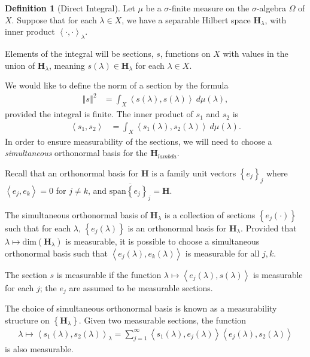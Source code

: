 \documentclass[12pt]{extarticle}
\newcommand{\set}[1]{\left\{#1\right\}}
\newcommand{\iprod}[2]{\left\langle #1,#2\right\rangle}
\newcommand{\norm}[1]{\left\Vert #1\right\Vert}
\theoremstyle{plain}
\theoremstyle{definition}
\newtheorem*{definition}{Definition}
\theoremstyle{remark}
\renewcommand{\newline}{\hfill\break}
\begin{document}
  \begin{definition}[Direct Integral]
    Let $\mu$ be a $\sigma$-finite measure on the $\sigma$-algebra $\Omega$ of $X$. Suppose that for each $\lambda \in X$, we have a separable Hilbert space $\mathbf{H}_{\lambda}$, with inner product $\iprod{\cdot}{\cdot}_{\lambda}$.\newline

    Elements of the integral will be sections, $s$, functions on $X$ with values in the union of $\mathbf{H}_{\lambda}$, meaning $s(\lambda)\in \mathbf{H}_{\lambda}$ for each $\lambda \in X$.\newline

    We would like to define the norm of a section by the formula
    \begin{align*}
      \norm{s}^{2} &= \int_{X}^{} \iprod{s(\lambda)}{s(\lambda)}\:d\mu(\lambda),
    \end{align*}
    provided the integral is finite. The inner product of $s_1$ and $s_2$ is
    \begin{align*}
      \iprod{s_1}{s_2} &= \int_{X}^{} \iprod{s_1(\lambda)}{s_2(\lambda)}\:d\mu(\lambda).
    \end{align*}
    In order to ensure measurability of the sections, we will need to choose a \textit{simultaneous} orthonormal basis for the $\mathbf{H}_{lambda}$.\newline

    Recall that an orthonormal basis for $\mathbf{H}$ is a family unit vectors $\set{e_j}_j$ where $\iprod{e_j}{e_k} = 0$ for $j\neq k$, and $\overline{\text{span}\set{e_j}_j} = \mathbf{H}$.\newline

    The simultaneous orthonormal basis of $\mathbf{H}_{\lambda}$ is a collection of sections $\set{e_j(\cdot)}$ such that for each $\lambda$, $\set{e_j(\lambda)}$ is an orthonormal basis for $\mathbf{H}_{\lambda}$. Provided that $\lambda \mapsto \text{dim}(\mathbf{H}_{\lambda})$ is measurable, it is possible to choose a simultaneous orthonormal basis such that $\iprod{e_j(\lambda)}{e_k(\lambda)}$ is measurable for all $j,k$.\newline

    The section $s$ is measurable if the function $\lambda \mapsto \iprod{e_j(\lambda)}{s(\lambda)}$ is measurable for each $j$; the $e_j$ are assumed to be measurable sections.\newline

    The choice of simultaneous orthonormal basis is known as a measurability structure on $\set{\mathbf{H}_{\lambda}}$. Given two measurable sections, the function
    \begin{align*}
      \lambda \mapsto \iprod{s_1(\lambda)}{s_2(\lambda)}_\lambda = \sum_{j=1}^{\infty}\iprod{s_1(\lambda)}{e_j(\lambda)}\iprod{e_j(\lambda)}{s_2(\lambda)}
    \end{align*}
    is also measurable.\newline


\end{definition}
\end{document}
